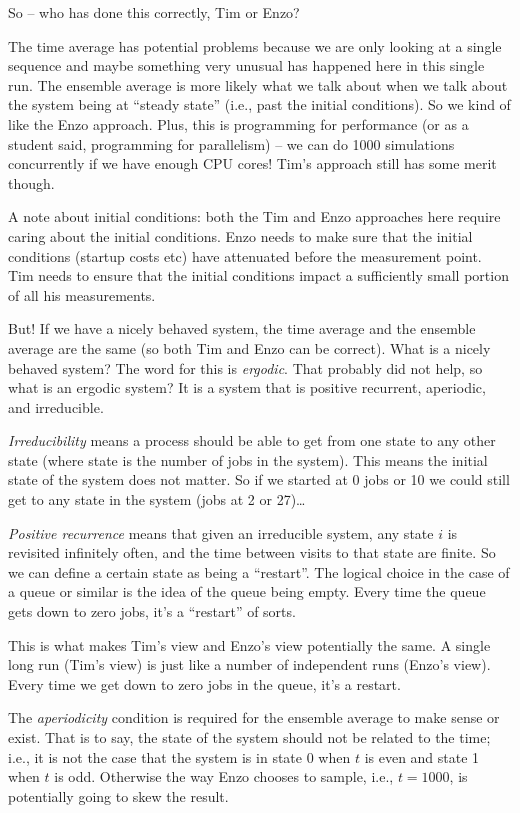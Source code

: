 \documentclass[a4paper]{report}
\begin{document}
So -- who has done this correctly, Tim or Enzo?

The time average has potential problems because we are only looking at a single sequence and maybe something very unusual has happened here in this single run. The ensemble average is more likely what we talk about when we talk about the system being at ``steady state'' (i.e., past the initial conditions). So we kind of like the Enzo approach. Plus, this is programming for performance (or as a student said, programming for parallelism) -- we can do 1000 simulations concurrently if we have enough CPU cores! Tim's approach still has some merit though.

A note about initial conditions: both the Tim and Enzo approaches here require caring about the initial conditions. Enzo needs to make sure that the initial conditions (startup costs etc) have attenuated before the measurement point. Tim needs to ensure that the initial conditions impact a sufficiently small portion of all his measurements.

But! If we have a nicely behaved system, the time average and the ensemble average are the same (so both Tim and Enzo can be correct). What is a nicely behaved system? The word for this is \textit{ergodic}. That probably did not help, so what is an ergodic system? It is a system that is positive recurrent, aperiodic, and irreducible.

\textit{Irreducibility} means a process should be able to get from one state to any other state (where state is the number of jobs in the system). This means the initial state of the system does not matter. So if we started at 0 jobs or 10 we could still get to any state in the system (jobs at 2 or 27)\ldots

\textit{Positive recurrence} means that given an irreducible system, any state $i$ is revisited infinitely often, and the time between visits to that state are finite. So we can define a certain state as being a ``restart''. The logical choice in the case of a queue or similar is the idea of the queue being empty. Every time the queue gets down to zero jobs, it's a ``restart'' of sorts. 

This is what makes Tim's view and Enzo's view potentially the same. A single long run (Tim's view) is just like a number of independent runs (Enzo's view). Every time we get down to zero jobs in the queue, it's a restart. 

The \textit{aperiodicity} condition is required for the ensemble average to make sense or exist. That is to say, the state of the system should not be related to the time; i.e., it is not the case that the system is in state 0 when $t$ is even and state 1 when $t$ is odd. Otherwise the way Enzo chooses to sample, i.e., $t = 1000$, is potentially going to skew the result.
\end{document}
